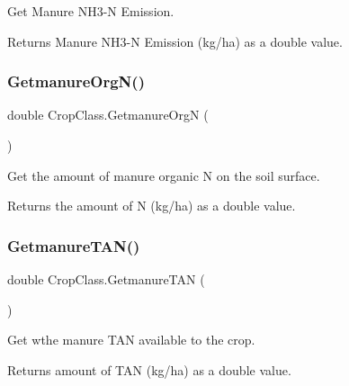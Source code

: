 Get Manure N\+H3-\/N Emission. 

\begin{DoxyReturn}{Returns}
Manure N\+H3-\/N Emission (kg/ha) as a double value. 
\end{DoxyReturn}
\mbox{\label{class_crop_class_a88bcd4b2bad88a2c0269e456eef3bf59}} 
\subsubsection{\texorpdfstring{GetmanureOrgN()}{GetmanureOrgN()}}
{\footnotesize\ttfamily double Crop\+Class.\+Getmanure\+OrgN (\begin{DoxyParamCaption}{ }\end{DoxyParamCaption})\hspace{0.3cm}{\ttfamily [inline]}}



Get the amount of manure organic N on the soil surface. 

\begin{DoxyReturn}{Returns}
the amount of N (kg/ha) as a double value. 
\end{DoxyReturn}
\mbox{\label{class_crop_class_af24daf4f7c4f8da19d3c40c4d008b657}} 
\subsubsection{\texorpdfstring{GetmanureTAN()}{GetmanureTAN()}}
{\footnotesize\ttfamily double Crop\+Class.\+Getmanure\+T\+AN (\begin{DoxyParamCaption}{ }\end{DoxyParamCaption})\hspace{0.3cm}{\ttfamily [inline]}}



Get wthe manure T\+AN available to the crop. 

\begin{DoxyReturn}{Returns}
amount of T\+AN (kg/ha) as a double value. 
\end{DoxyReturn}
\mbox{\label{class_crop_class_a4c47e81d7f855b6433e4be443fa27466}} 
